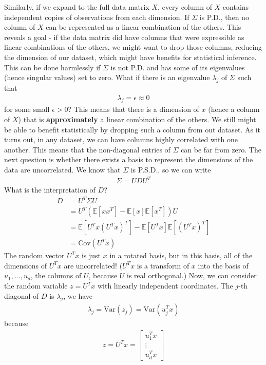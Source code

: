 \documentclass[11pt]{article}
\newcommand{\EV}{\ensuremath{\mathbb E}}
\newcommand{\Var}{\text{Var}}
\newcommand{\Cov}{\text{Cov}}
\theoremstyle{plain}
\theoremstyle{definition}
\theoremstyle{remark}
\begin{document}
Similarly, if we expand to the full data matrix $X$, every column of $X$ contains independent copies of observations from each dimension. If $\Sigma$ is P.D., then no column of $X$ can be represented as a linear combination of the others. This reveals a goal - if the data matrix did have columns that were expressible as linear combinations of the others, we might want to drop those columns, reducing the dimension of our dataset, which might have benefits for statistical inference. This can be done harmlessly if $\Sigma$ is not P.D. and has some of its eigenvalues (hence singular values) set to zero. What if there is an eigenvalue $\lambda_j$ of $\Sigma$ such that
\begin{align*}
    \lambda_j = \epsilon \approx 0
\end{align*}
for some small $\epsilon > 0$? This means that there is a dimension of $x$ (hence a column of $X$) that is {\bf approximately} a linear combination of the others. We still might be able to benefit statistically by dropping such a column from out dataset. As it turns out, in any dataset, we can have columns highly correlated with one another. This means that the non-diagonal entries of $\Sigma$ can be far from zero. The next question is whether there exists a basis to represent the dimensions of the data are uncorrelated. We know that $\Sigma$ is P.S.D., so we can write
\begin{align*}
    \Sigma = UDU^T
\end{align*}
What is the interpretation of $D$?
\begin{align*}
    D &= U^T \Sigma U\\ 
    &= U^T (\EV[xx^T] - \EV[x]\EV[x^T]) U\\
    &= \EV[U^T x(U^T x)^T] - \EV[U^T x]\EV[(U^T x)^T]\\
    &= \Cov(U^T x)
\end{align*}
The random vector $U^T x$ is just $x$ in a rotated basis, but in this basis, all of the dimensions of $U^T x$ are uncorrelated! ($U^Tx$ is a transform of $x$ into the basis of $u_1, ..., u_d$, the columns of $U$, because $U$ is real orthogonal.) Now, we can consider the random variable $z = U^T x$ with linearly independent coordinates. The $j$-th diagonal of $D$ is $\lambda_j$, we have
\begin{align*}
    \lambda_j = \Var(z_j) = \Var(u_j^T x)
\end{align*}
because
\begin{align*}
    z = U^T x = \begin{bmatrix}
    u_1^T x\\
    \vdots\\
    u_d^T x
    \end{bmatrix}
\end{align*}
\end{document}
